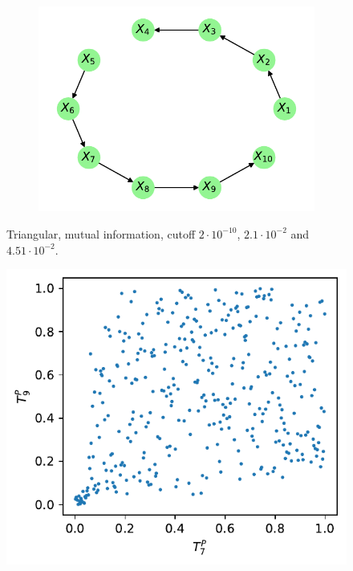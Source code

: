 \documentclass[../Thesis.tex]{subfiles}
\begin{document}
\begin{figure}[H]
\begin{subfigure}[t]{0.49\textwidth}
        \caption{}
    \end{subfigure}
    \\[\baselineskip]
    \begin{subfigure}[t]{0.49\textwidth}
        \centering
        \includegraphics[width=.95\linewidth]{figures/Gaussian Chain Theoretical/Chain graph from triangular G obs - MI - cutoff 4_51e-2.pdf}
        \caption{}
    \end{subfigure}
    \caption{Triangular, mutual information, cutoff $2\cdot 10^{-10}$, $2.1 \cdot 10^{-2}$ and $4.51 \cdot 10^{-2}$.}
    \label{fig:Gaussian chain symmetric G_obs using mutual information different cutoff}
\end{figure}

\newpage
\begin{figure}
    \centering
    \includegraphics[width=.5\linewidth]{figures/Cycle data/G_dir times - symmetric - TP9 vs TP7.pdf}
    \caption{}
    \label{fig:G_dir times - TP9 vs TP7}
\end{figure}
\end{document}
